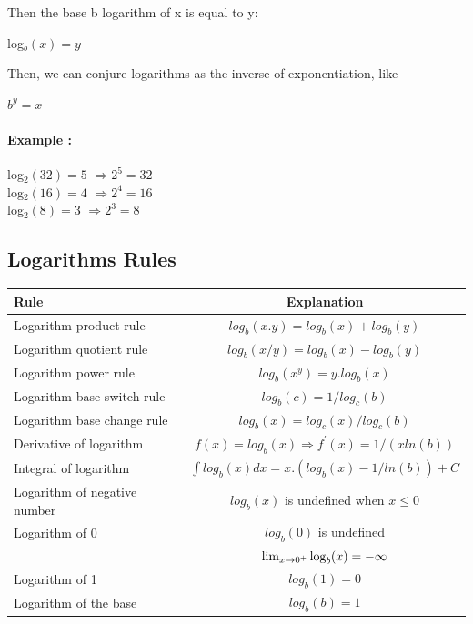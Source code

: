 \documentclass[12pt]{article}
\begin{document}
Then the base b logarithm of x is equal to y:

\begin{center} 	log$_{b}(x) = y$	\end{center}

Then, we can conjure logarithms as the inverse of exponentiation, like
\begin{center}	$b^{y} = x $		\end{center}
\paragraph{Example :\\}
\begin{center}
log$_{2}(32) = 5$	$\Rightarrow 2^{5} = 32 $
\\log$_{2}(16) = 4$ $\Rightarrow 2^{4} = 16 $
\\log$_{2}(8) = 3$ $\Rightarrow 2^{3} = 8 $
\end{center}

\subsection{Logarithms Rules}
\begin{tabular}{| l | c | }
	\hline	
		\textbf{Rule} & \textbf{Explanation} \\
		\hline
		\hline
		Logarithm product rule 		& $log_{b}(x . y) = log_{b}(x) + log_{b}(y)$ \\ \hline
		Logarithm quotient rule 		& $log_{b}(x / y) = log_{b}(x) - log_{b}(y)$ \\ \hline
		Logarithm power rule			& $log_{b}(x ^{y}) = y . log_{b}(x)$  \\ \hline
		Logarithm base switch rule 	& $log_{b}(c) = 1 / log_{c}(b)$	\\ \hline
		Logarithm base change rule 	& $log_{b}(x) = log_{c}(x) / log_{c}(b)$	\\ \hline
		Derivative of logarithm		& $f(x) = log_{b}(x) \Rightarrow f^{'}(x) = 1 / ( x ln(b))$ \\ \hline
		Integral of logarithm		& $\int log_{b}(x) dx = x . ( log_{b}(x) - 1 / ln(b) ) + C$  \\ \hline
		Logarithm of negative number & $log_{b}(x)$ is undefined when $x \le 0$   \\ \hline
		Logarithm of 0				& $log_{b}(0)$ is undefined \\ & $\lim_{x\to 0^+}\textup{log}_b(x)=-\infty$   \\ \hline
		Logarithm of 1				& $log_{b}(1) = 0$  \\ \hline
		Logarithm of the base		& $log_{b}(b) = 1$  \\ \hline
\end{tabular}
\end{document}
